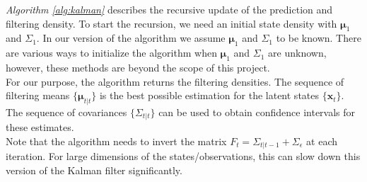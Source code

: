 \documentclass[11pt, oneside]{scrreprt}   	%
\begin{document}
\textit{Algorithm \ref{alg:kalman}} describes the recursive update of the prediction and filtering density.  To start the recursion, we need an initial state density with $\boldsymbol{\mu}_1$ and $\Sigma_1$. In our version of the algorithm we assume $\boldsymbol{\mu}_1$ and $\Sigma_1$ to be known. There are various ways to initialize the algorithm when $\boldsymbol{\mu}_1$ and $\Sigma_1$ are unknown, however, these methods are beyond the scope of this project.\\

For our purpose, the algorithm returns the filtering densities. 
The sequence of filtering means $\{\boldsymbol{\mu}_{t | t}\}$ is the best possible estimation for the latent states $\{\boldsymbol{x}_t\}$. 
The sequence of covariances $\{\Sigma_{t | t}\}$ can be used to obtain confidence intervals for these estimates. \\  

Note that the algorithm needs to invert the matrix $F_t = \Sigma_{t | t-1} + \Sigma_{\epsilon}$ at each iteration. For large dimensions of the states/observations, this can slow down this version of the Kalman filter significantly.

\end{document}
